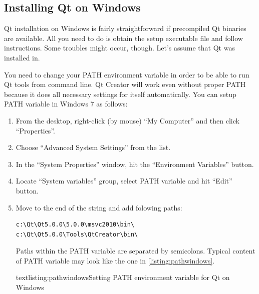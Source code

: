 \subsection{Installing Qt on Windows}
Qt installation on Windows is fairly straightforward if precompiled Qt binaries are available. All you need to do is obtain the setup executable file and follow instructions. Some troubles might occur, though. Let's assume that Qt was installed in.

You need to change your PATH environment variable in order to be able to run Qt tools from command line. Qt Creator will work even without proper PATH because it does all necessary settings for itself automatically. You can setup PATH variable in Windows 7 as follows:
\begin{enumerate}
\item From the desktop, right-click (by mouse) \enquote{My Computer} and then click \enquote{Properties}.
\item Choose \enquote{Advanced System Settings} from the list.
\item In the \enquote{System Properties} window, hit the \enquote{Environment Variables} button.
\item Locate \enquote{System variables} group, select PATH variable and hit \enquote{Edit} button.
\item Move to the end of the string and add folowing paths:
\begin{lstlisting}[firstnumber=1,language=text]
c:\Qt\Qt5.0.0\5.0.0\msvc2010\bin\
c:\Qt\Qt5.0.0\Tools\QtCreator\bin\
\end{lstlisting}
Paths within the PATH variable are separated by semicolons. Typical content of PATH variable may look like the one in \autoref{listing:pathwindows}.
\begin{fdoccode}{text}{listing:pathwindows}{Setting PATH environment variable for Qt on Windows}
\end{fdoccode}
\end{enumerate}

